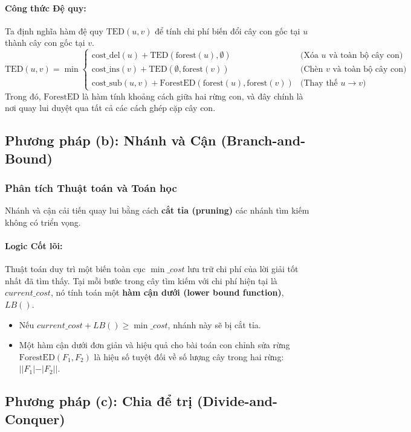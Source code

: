 \documentclass[a4paper,12pt]{article}
\begin{document}
\paragraph{Công thức Đệ quy:}
Ta định nghĩa hàm đệ quy $\text{TED}(u, v)$ để tính chi phí biến đổi cây con gốc tại $u$ thành cây con gốc tại $v$.
\[
\text{TED}(u, v) = \min
\begin{cases}
    \text{cost\_del}(u) + \text{TED}(\text{forest}(u), \emptyset) & \text{(Xóa } u\text{ và toàn bộ cây con)} \\
    \text{cost\_ins}(v) + \text{TED}(\emptyset, \text{forest}(v)) & \text{(Chèn } v\text{ và toàn bộ cây con)} \\
    \text{cost\_sub}(u, v) + \text{ForestED}(\text{forest}(u), \text{forest}(v)) & \text{(Thay thế } u \to v)
\end{cases}
\]
Trong đó, $\text{ForestED}$ là hàm tính khoảng cách giữa hai rừng con, và đây chính là nơi quay lui duyệt qua tất cả các cách ghép cặp cây con.

\subsection{Phương pháp (b): Nhánh và Cận (Branch-and-Bound)}
\subsubsection{Phân tích Thuật toán và Toán học}
Nhánh và cận cải tiến quay lui bằng cách \textbf{cắt tỉa (pruning)} các nhánh tìm kiếm không có triển vọng.

\paragraph{Logic Cốt lõi:}
Thuật toán duy trì một biến toàn cục $\min\_cost$ lưu trữ chi phí của lời giải tốt nhất đã tìm thấy. Tại mỗi bước trong cây tìm kiếm với chi phí hiện tại là $current\_cost$, nó tính toán một \textbf{hàm cận dưới (lower bound function)}, $LB()$.
\begin{itemize}
    \item Nếu $current\_cost + LB() \ge \min\_cost$, nhánh này sẽ bị cắt tỉa.
    \item Một hàm cận dưới đơn giản và hiệu quả cho bài toán con chỉnh sửa rừng $\text{ForestED}(F_1, F_2)$ là hiệu số tuyệt đối về số lượng cây trong hai rừng: $| |F_1| - |F_2| |$.
\end{itemize}

\subsection{Phương pháp (c): Chia để trị (Divide-and-Conquer)}
\end{document}
